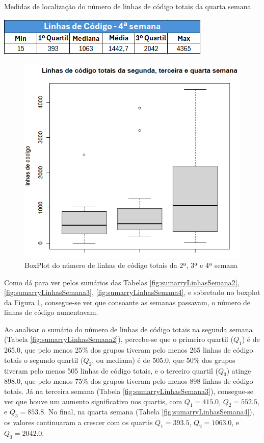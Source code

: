 \documentclass[%
 aip,
cp,  %
 amsmath,amssymb,%
 reprint,%
]{revtex4-2}
\begin{document}
\begin{table}[!h]
    \centering
    \caption{Medidas de localização do número de linhas de código totais da quarta semana}
    \label{fig:sumarryLinhasSemana4}
    \includegraphics[width=0.5\linewidth]{imagens//questao2/sumarryLinhasSemana4.png}
\end{table}

\begin{figure}[!h]
    \centering
    \includegraphics[width=0.5\linewidth]{imagens//questao2/boxplotDas3Semanas.png}
    \caption{BoxPlot do número de linhas de código totais da 2ª, 3ª e 4ª semana}
    \label{fig:BoxPlotDas3Semanas}
\end{figure}

Como dá para ver pelos sumários das Tabelas  \ref{fig:sumarryLinhasSemana2},  \ref{fig:sumarryLinhasSemana3}, \ref{fig:sumarryLinhasSemana4}, e sobretudo no boxplot da Figura \ref{fig:BoxPlotDas3Semanas}, consegue-se ver que consoante as semanas passavam, o número de linhas de código aumentavam.

Ao analisar o sumário do número de linhas de código totais na segunda semana (Tabela \ref{fig:sumarryLinhasSemana2}), percebe-se que o primeiro quartil ($Q_1$) é de 265.0, que pelo menos 25\% dos grupos tiveram pelo menos 265 linhas de código totais o segundo quartil ($Q_2$, ou mediana) é de 505.0, que 50\% dos grupos tiveram pelo menos 505 linhas de código totais, e o terceiro quartil ($Q_3$) atinge 898.0, que pelo menos 75\% dos grupos tiveram pelo menos 898 linhas de código totais. Já na terceira semana (Tabela \ref{fig:sumarryLinhasSemana3}), consegue-se ver que houve um aumento significativo nos quartis, com $Q_1=415.0$, $Q_2=552.5$, e $Q_3=853.8$. No final, na quarta semana (Tabela \ref{fig:sumarryLinhasSemana4}), os valores continuaram a crescer com os quartis $Q_1=393.5$, $Q_2=1063.0$, e $Q_3=2042.0$.
\end{document}
